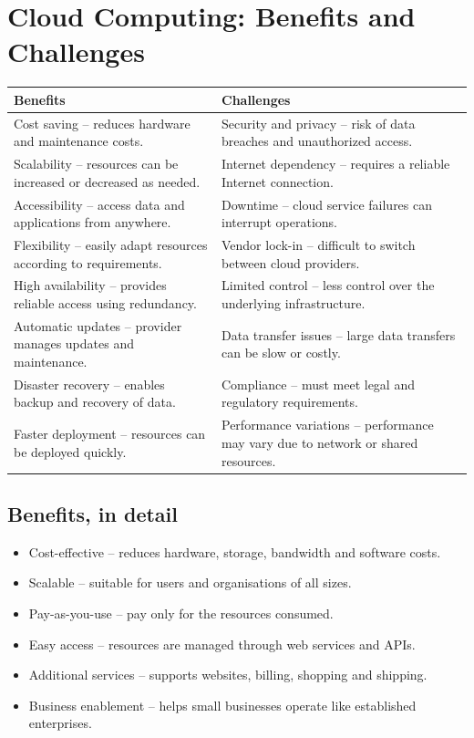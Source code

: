 \documentclass[11pt,a4paper]{article}
\begin{document}
\section{Cloud Computing: Benefits and Challenges}

\begin{tabularx}{\textwidth}{@{}X X@{}}
\toprule
\rowcolor{tablehead}\textbf{Benefits} & \textbf{Challenges} \\
\midrule
Cost saving -- reduces hardware and maintenance costs. & Security and privacy -- risk of data
  breaches and unauthorized access. \\
\addlinespace
Scalability -- resources can be increased or decreased as needed. & Internet dependency --
  requires a reliable Internet connection. \\
\addlinespace
Accessibility -- access data and applications from anywhere. & Downtime -- cloud service
  failures can interrupt operations. \\
\addlinespace
Flexibility -- easily adapt resources according to requirements. & Vendor lock-in -- difficult
  to switch between cloud providers. \\
\addlinespace
High availability -- provides reliable access using redundancy. & Limited control -- less
  control over the underlying infrastructure. \\
\addlinespace
Automatic updates -- provider manages updates and maintenance. & Data transfer issues -- large
  data transfers can be slow or costly. \\
\addlinespace
Disaster recovery -- enables backup and recovery of data. & Compliance -- must meet legal and
  regulatory requirements. \\
\addlinespace
Faster deployment -- resources can be deployed quickly. & Performance variations --
  performance may vary due to network or shared resources. \\
\bottomrule
\end{tabularx}

\subsection{Benefits, in detail}


\begin{itemize}\itemsep2pt
  \item Cost-effective -- reduces hardware, storage, bandwidth and software costs.
  \item Scalable -- suitable for users and organisations of all sizes.
  \item Pay-as-you-use -- pay only for the resources consumed.
  \item Easy access -- resources are managed through web services and APIs.
  \item Additional services -- supports websites, billing, shopping and shipping.
  \item Business enablement -- helps small businesses operate like established enterprises.
\end{itemize}
\end{document}
